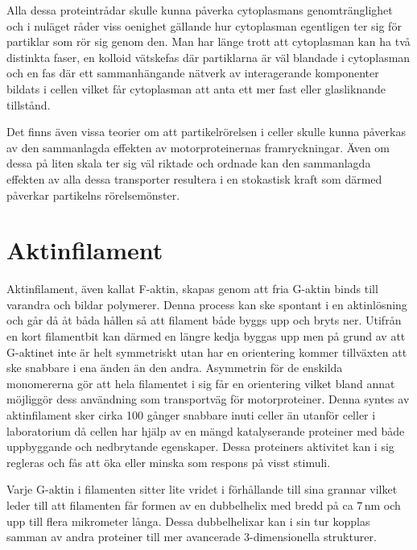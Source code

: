 Alla dessa proteintrådar skulle kunna påverka cytoplasmans genomtränglighet och i nuläget råder viss oenighet gällande hur cytoplasman egentligen ter sig för partiklar som rör sig genom den. Man har länge trott att cytoplasman kan ha två distinkta faser, en kolloid vätskefas där partiklarna är väl blandade i cytoplasman och en fas där ett sammanhängande nätverk av interagerande komponenter bildats i cellen vilket får cytoplasman att anta ett mer fast eller glasliknande tillstånd.

Det finns även vissa teorier om att partikelrörelsen i celler skulle kunna påverkas av den sammanlagda effekten av motorproteinernas framryckningar. Även om dessa på liten skala ter sig väl riktade och ordnade kan den sammanlagda effekten av alla dessa transporter resultera i en stokastisk kraft som därmed påverkar partikelns rörelsemönster. 



\section{Aktinfilament}

Aktinfilament\cite{Cooper_TheCell2000}, även kallat F-aktin, skapas genom att fria G-aktin binds till varandra och bildar polymerer. Denna process kan ske spontant i en aktinlösning och går då åt båda hållen så att filament både byggs upp och bryts ner. Utifrån en kort filamentbit kan därmed en längre kedja byggas upp men på grund av att G-aktinet inte är helt symmetriskt utan har en orientering kommer tillväxten att ske snabbare i ena änden än den andra. Asymmetrin för de enskilda monomererna gör att hela filamentet i sig får en orientering vilket bland annat möjliggör dess användning som transportväg för motorproteiner. Denna syntes av aktinfilament sker cirka 100 gånger snabbare inuti celler än utanför celler i laboratorium då cellen har hjälp av en mängd  katalyserande proteiner med både uppbyggande och nedbrytande egenskaper. Dessa proteiners aktivitet kan i sig regleras och fås att öka eller minska som respons på visst stimuli.

Varje G-aktin i filamenten sitter lite vridet i förhållande till sina grannar vilket leder till att filamenten får formen av en dubbelhelix med bredd på ca 7\,nm och upp till flera mikrometer långa. Dessa dubbelhelixar kan i sin tur kopplas samman av andra proteiner till mer avancerade 3-dimensionella strukturer.

